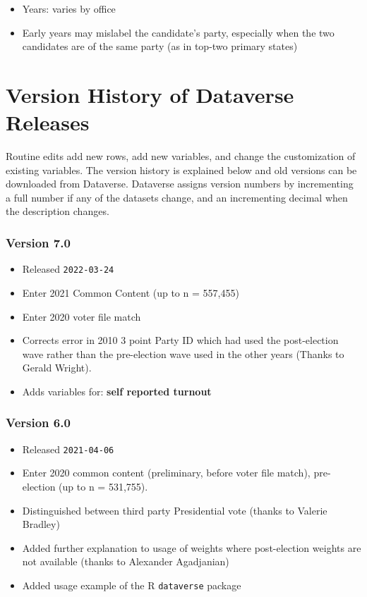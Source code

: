 \documentclass[10pt,article,oneside]{memoir}
\theoremstyle{definition}
\begin{document}
\begin{itemize}
\tightlist
\item
  Years: varies by office
\item
  Early years may mislabel the candidate's party, especially when the
  two candidates are of the same party (as in top-two primary states)
\end{itemize}

\newpage

\hypertarget{version-history-of-dataverse-releases}{%
\section{Version History of Dataverse
Releases}\label{version-history-of-dataverse-releases}}

Routine edits add new rows, add new variables, and change the
customization of existing variables. The version history is explained
below and old versions can be downloaded from Dataverse. Dataverse
assigns version numbers by incrementing a full number if any of the
datasets change, and an incrementing decimal when the description
changes.

\hypertarget{version-7.0}{%
\subsubsection{Version 7.0}\label{version-7.0}}

\begin{itemize}
\tightlist
\item
  Released \texttt{2022-03-24}
\item
  Enter 2021 Common Content (up to n = 557,455)
\item
  Enter 2020 voter file match
\item
  Corrects error in 2010 3 point Party ID which had used the
  post-election wave rather than the pre-election wave used in the other
  years (Thanks to Gerald Wright).
\item
  Adds variables for: \textbf{self reported turnout}
\end{itemize}

\hypertarget{version-6.0}{%
\subsubsection{Version 6.0}\label{version-6.0}}

\begin{itemize}
\tightlist
\item
  Released \texttt{2021-04-06}
\item
  Enter 2020 common content (preliminary, before voter file match),
  pre-election (up to n = 531,755).
\item
  Distinguished between third party Presidential vote (thanks to Valerie
  Bradley)
\item
  Added further explanation to usage of weights where post-election
  weights are not available (thanks to Alexander Agadjanian)
\item
  Added usage example of the R \texttt{dataverse} package
\end{itemize}
\end{document}
